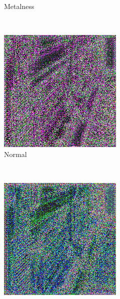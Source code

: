 \begin{figure}[h!]
\begin{subfigure}[b]{0.175\textwidth}
     \caption{Metalness}
    \end{subfigure}
    ~
    \begin{subfigure}[b]{0.175\textwidth}
     \includegraphics[width=\textwidth]{figures/result/triple/depth_albedo_normal/1.png}
     \caption{Normal}
    \end{subfigure}
    \\ \vspace{0.2cm} 
    \begin{subfigure}[b]{0.175\textwidth}
     \includegraphics[width=\textwidth]{figures/result/triple/depth_albedo_position/1.png}

\end{subfigure}
\end{figure}
